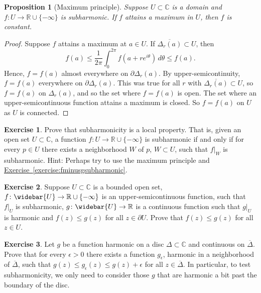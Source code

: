 \documentclass[12pt,openany]{book}
\newcommand{\C}{{\mathbb{C}}}
\newcommand{\R}{{\mathbb{R}}}
\theoremstyle{plain}
\newtheorem{prop}[thm]{Proposition}
\theoremstyle{remark}
\theoremstyle{definition}
\newenvironment{exbox}{%
    \def\FrameCommand{\vrule width 1pt \relax\hspace{10pt}}%
    \MakeFramed {\advance \hsize -\width \FrameRestore}%
}{%
    \endMakeFramed
}
\theoremstyle{exercise}
\newtheorem{exercise}{Exercise}[section]
\theoremstyle{example}
\newcommand{\exerciseref}[1]{\hyperref[#1]{Exercise~\ref*{#1}}}
\begin{document}
\begin{prop}[Maximum principle]
Suppose $U \subset \C$ is a domain and $f \colon U \to \R \cup \{ -\infty \}$
is subharmonic.  If $f$ attains a maximum in $U$, then $f$ is constant.
\end{prop}

\begin{proof}
Suppose $f$ attains a maximum at $a \in U$.
If
$\overline{\Delta_r(a)} \subset U$, then
\begin{equation*}
f(a) \leq \frac{1}{2\pi} \int_0^{2\pi} f(a+re^{i\theta})\, d\theta \leq f(a)
.
\end{equation*}
Hence, $f = f(a)$ almost everywhere on $\partial \Delta_r(a)$.
By upper-semicontinuity, $f = f(a)$ everywhere on $\partial \Delta_r(a)$.
This was true for all $r$
with $\overline{\Delta_r(a)} \subset U$, so $f=f(a)$ on $\Delta_r(a)$,
and so the set where $f=f(a)$ is open.  The set where an upper-semicontinuous
function attains a maximum is closed.  So $f=f(a)$ on $U$ as $U$ is
connected.
\end{proof}

\begin{exbox}
\begin{exercise}
Prove that subharmonicity is a local property.  That is, given an open set
$U \subset \C$, a function $f \colon U \to \R \cup \{ -\infty \}$ is subharmonic if
and only if for every $p \in U$ there exists a neighborhood $W$ of $p$,
$W \subset U$, such that $f|_{W}$ is subharmonic.  Hint: Perhaps try to use
the maximum principle and \exerciseref{exercise:fminusgsubharmonic}.
\end{exercise}

\begin{exercise}
Suppose $U \subset \C$ is a bounded open set, $f \colon \widebar{U} \to \R
\cup \{-\infty\}$ is an upper-semicontinuous function, such that $f|_U$
is subharmonic, $g \colon \widebar{U} \to \R$ is a continuous function
such that $g|_U$ is harmonic and
$f(z) \leq g(z)$ for all $z \in \partial U$.  Prove that
$f(z) \leq g(z)$ for all $z \in U$.
\end{exercise}

\begin{exercise} \label{exercise:onlyniceuneededforsubharmonic}
Let $g$ be a function
harmonic on a disc $\Delta \subset \C$ and continuous on
$\overline{\Delta}$.  Prove that for every $\epsilon > 0$ there exists
a function $g_\epsilon$, harmonic in a neighborhood of $\overline{\Delta}$,
such that $g(z) \leq g_\epsilon(z) \leq g(z)+\epsilon$ for all $z \in
\overline{\Delta}$.
In particular, to test subharmonicity, we only need to consider those
$g$ that are harmonic a bit past the boundary of the disc.
\end{exercise}
\end{exbox}
\end{document}
